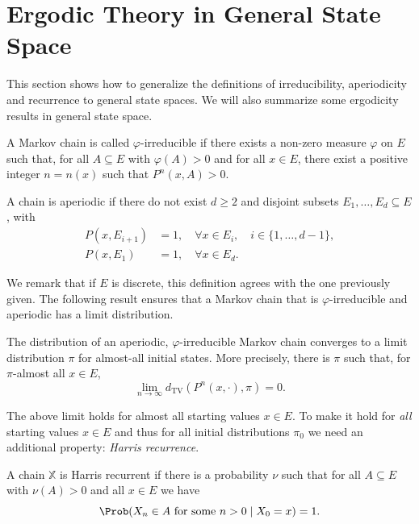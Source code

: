 \section{Ergodic Theory in General State Space}
\label{sec:A.5}

This section shows how to generalize the definitions of irreducibility, aperiodicity and recurrence
to general state spaces.  We will also summarize some ergodicity results in general state space.

\begin{definition}
\label{def:A.26}
A Markov chain is called $\varphi$-irreducible if there exists a non-zero measure $\varphi$ on $E$
such that, for all $A \subseteq E$ with $\varphi(A) > 0$ and for all $x \in E$, there exist a
positive integer $n = n(x)$ such that $P^n(x, A) > 0$.
\end{definition}

\begin{definition}
\label{def:A.27}
A chain is aperiodic if there do not exist $d \geq 2$ and disjoint subsets $E_1, \ldots, E_d
\subseteq E$, with
\begin{align*}
  P(x, E_{i+1}) &= 1, \quad \forall x \in E_i, \quad i \in \{1, \ldots, d-1\}, \\
  P(x, E_1)     &= 1, \quad \forall x \in E_d.
\end{align*}
\end{definition}

We remark that if $E$ is discrete, this definition agrees with the one previously given.  The
following result ensures that a Markov chain that is $\varphi$-irreducible and aperiodic has a
limit distribution.

\begin{theorem}
\label{thm:A.28}
The distribution of an aperiodic, $\varphi$-irreducible Markov chain converges to a limit
distribution $\pi$ for almost-all initial states.  More precisely, there is $\pi$ such that, for
$\pi$-almost all $x \in E$,
\[
  \lim_{n \to \infty} d_{\mathrm{TV}}(P^n(x, \cdot), \pi) = 0.
\]
\end{theorem}

The above limit holds for almost all starting values $x \in E$.  To make it hold for \emph{all}
starting values $x \in E$ and thus for all initial distributions $\pi_0$ we need an additional
property: \emph{Harris recurrence}.

\begin{definition}
\label{def:A.29}
A chain $\mathbb{X}$ is Harris recurrent if there is a probability $\nu$ such that for all
$A \subseteq E$ with $\nu(A) > 0$ and all $x \in E$ we have
\[
  \Prob(X_n \in A \text{ for some } n > 0 \mid X_0 = x) = 1.
\]
\end{definition}

